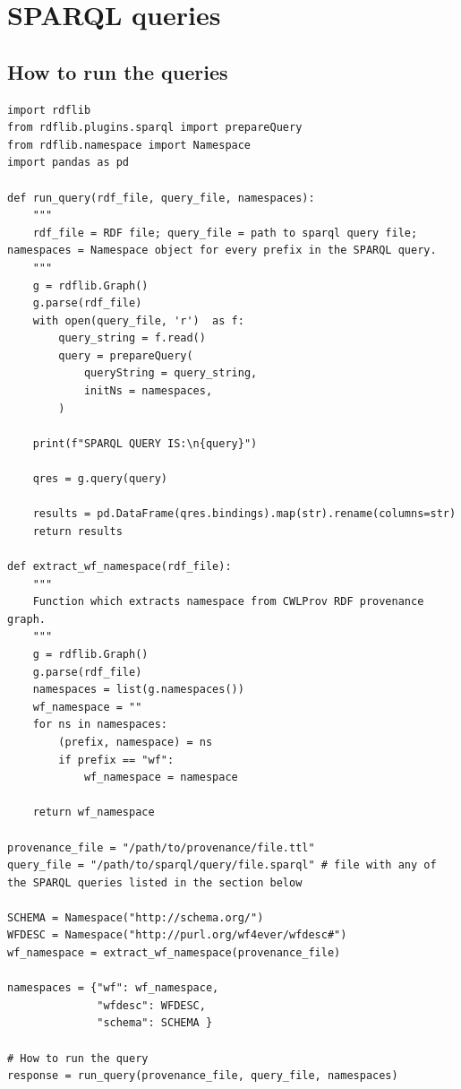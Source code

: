 \onecolumn
\section{SPARQL queries}
\label{renske:sup:sparql}

\subsection{How to run the queries}

\begin{verbatim}
import rdflib
from rdflib.plugins.sparql import prepareQuery
from rdflib.namespace import Namespace
import pandas as pd

def run_query(rdf_file, query_file, namespaces):
    """
    rdf_file = RDF file; query_file = path to sparql query file; namespaces = Namespace object for every prefix in the SPARQL query.
    """
    g = rdflib.Graph()
    g.parse(rdf_file)
    with open(query_file, 'r')  as f:
        query_string = f.read()
        query = prepareQuery(
            queryString = query_string,
            initNs = namespaces,
        )

    print(f"SPARQL QUERY IS:\n{query}")
    
    qres = g.query(query)
    
    results = pd.DataFrame(qres.bindings).map(str).rename(columns=str)
    return results

def extract_wf_namespace(rdf_file):
    """
    Function which extracts namespace from CWLProv RDF provenance graph.
    """
    g = rdflib.Graph()
    g.parse(rdf_file)
    namespaces = list(g.namespaces())
    wf_namespace = ""
    for ns in namespaces:
        (prefix, namespace) = ns
        if prefix == "wf":
            wf_namespace = namespace

    return wf_namespace

provenance_file = "/path/to/provenance/file.ttl"
query_file = "/path/to/sparql/query/file.sparql" # file with any of the SPARQL queries listed in the section below

SCHEMA = Namespace("http://schema.org/")
WFDESC = Namespace("http://purl.org/wf4ever/wfdesc#")
wf_namespace = extract_wf_namespace(provenance_file)

namespaces = {"wf": wf_namespace, 
              "wfdesc": WFDESC,
              "schema": SCHEMA }

# How to run the query
response = run_query(provenance_file, query_file, namespaces)
\end{verbatim}

